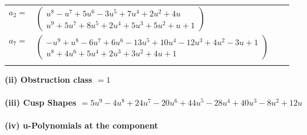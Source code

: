 \documentclass[1p]{elsarticle_modified}
\theoremstyle{definition}
\begin{document}
\begin{tabular}{m{7pt} m{180pt} m{7pt} m{180pt} }
\flushright $a_{2}=$&$\begin{pmatrix}u^8- u^7+5 u^6-3 u^5+7 u^4+2 u^2+4 u\\u^9+5 u^7+8 u^5+2 u^4+5 u^3+5 u^2+u+1\end{pmatrix}$ \\
\flushright $a_{7}=$&$\begin{pmatrix}- u^9+u^8-6 u^7+6 u^6-13 u^5+10 u^4-12 u^3+4 u^2-3 u+1\\u^8+4 u^6+5 u^4+2 u^3+3 u^2+4 u+1\end{pmatrix}$\\&\end{tabular}
\flushleft \textbf{(ii) Obstruction class $= 1$}\\~\\
\flushleft \textbf{(iii) Cusp Shapes $= 5 u^9-4 u^8+24 u^7-20 u^6+44 u^5-28 u^4+40 u^3-8 u^2+12 u$}\\~\\
\newpage\renewcommand{\arraystretch}{1}
\flushleft \textbf{(iv) u-Polynomials at the component}\newline \\
\end{document}
